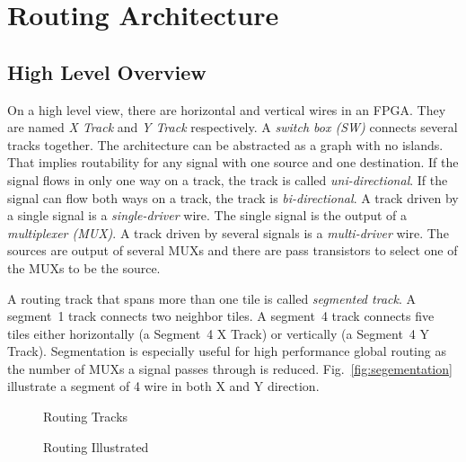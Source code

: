 \section{Routing Architecture}
\label{sec:routing_architecture}

\subsection{High Level Overview}
\label{subsec:hlv_routing_arch}
On a high level view, there are horizontal and vertical wires in an FPGA. They are named \emph{X Track} and \emph{Y Track} respectively. A \emph{switch box (SW)} 
connects several tracks together. The architecture can be abstracted as a graph with no islands. 
That implies routability for any signal with one source and one destination. If the 
signal flows in only one way on a track, the track is called \emph{uni-directional}. If the signal can flow both ways on a track, the track is \emph{bi-directional}.
A track driven by a single signal is a \emph{single-driver} wire. The single signal is the output of a \emph{multiplexer (MUX)}. A track driven by several
signals is a \emph{multi-driver} wire. The sources are output of several MUXs and there are pass transistors to select one of the MUXs to be the source. \par

A routing track that spans more than one tile is called \emph{segmented track}. A segment~1 track connects two neighbor tiles. A segment~4 track connects five 
tiles either horizontally (a Segment~4 X Track) or vertically (a Segment~4 Y Track). Segmentation is especially useful for high performance global routing
as the number of MUXs a signal passes through is reduced. Fig.~\ref{fig:segementation} illustrate a segment of 4 wire in both X and Y direction. \par

\begin{figure}[htp]
	\begin{center}
		\epsfxsize=3in
		    \renewcommand{\captionfont}{\small}
				\caption{Routing Tracks
				\label{fig:routing_track}}
	\end{center}
\end{figure}

\begin{figure}[htp]
	\begin{center}
		\renewcommand{\captionfont}{\small}
		
		\hspace*{\fill}
		 \hfill
		\hspace*{\fill}	
			
		\caption{Routing Illustrated}
		\label{fig:r_illu}
	\end{center}
\end{figure}

